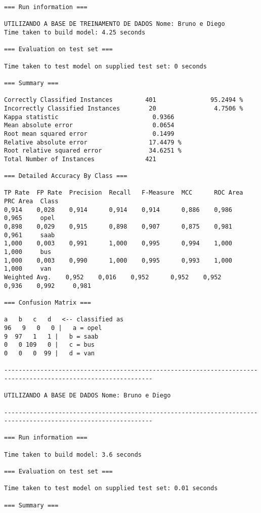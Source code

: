 \documentclass[
	article,			%
	11pt,				%
	oneside,			%
	a4paper,			%
	english,			%
	brazil,				%
	sumario=tradicional
	]{abntex2}
\begin{document}
\begin{lstlisting}
=== Run information ===

UTILIZANDO A BASE DE TREINAMENTO DE DADOS Nome: Bruno e Diego
Time taken to build model: 4.25 seconds

=== Evaluation on test set ===

Time taken to test model on supplied test set: 0 seconds

=== Summary ===

Correctly Classified Instances         401               95.2494 %
Incorrectly Classified Instances        20                4.7506 %
Kappa statistic                          0.9366
Mean absolute error                      0.0654
Root mean squared error                  0.1499
Relative absolute error                 17.4479 %
Root relative squared error             34.6251 %
Total Number of Instances              421     

=== Detailed Accuracy By Class ===

TP Rate  FP Rate  Precision  Recall   F-Measure  MCC      ROC Area  PRC Area  Class
0,914    0,028    0,914      0,914    0,914      0,886    0,986     0,965     opel
0,898    0,029    0,915      0,898    0,907      0,875    0,981     0,961     saab
1,000    0,003    0,991      1,000    0,995      0,994    1,000     1,000     bus
1,000    0,003    0,990      1,000    0,995      0,993    1,000     1,000     van
Weighted Avg.    0,952    0,016    0,952      0,952    0,952      0,936    0,992     0,981     

=== Confusion Matrix ===

a   b   c   d   <-- classified as
96   9   0   0 |   a = opel
9  97   1   1 |   b = saab
0   0 109   0 |   c = bus
0   0   0  99 |   d = van

---------------------------------------------------------------------------------------------------------------

UTILIZANDO A BASE DE DADOS Nome: Bruno e Diego

---------------------------------------------------------------------------------------------------------------

=== Run information ===

Time taken to build model: 3.6 seconds

=== Evaluation on test set ===

Time taken to test model on supplied test set: 0.01 seconds

=== Summary ===


\end{lstlisting}
\end{document}
